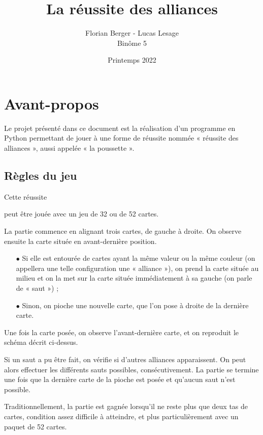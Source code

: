 \documentclass[titlepage]{article}
\title{\Huge{La réussite des alliances}}
\author{\Large{Florian Berger - Lucas Lesage}\\ \Large{Binôme 5}}
\date{Printemps 2022}
\begin{document}
\maketitle

\tableofcontents


\newpage
\section*{Avant-propos}

Le projet présenté dans ce document est la réalisation d’un programme en Python permettant de jouer à une forme de réussite nommée « réussite des alliances », aussi appelée « la poussette ». 

\subsection*{Règles du jeu}
\hypertarget{avant-propos}{Cette réussite} peut être jouée avec un jeu de 32 ou de 52 cartes. \par
La partie commence en alignant trois cartes, de gauche à droite. On observe ensuite la carte située en avant-dernière position. \vspace{5pt}
	\begin{itemize}
	\item[$\bullet$] Si elle est entourée de cartes ayant la même valeur ou la même couleur (on appellera une telle configuration une « alliance »), on prend la carte située au milieu et on la met sur la carte située immédiatement à sa gauche (on parle de « saut ») ;
	\item[$\bullet$] Sinon, on pioche une nouvelle carte, que l’on pose à droite de la dernière carte.
	\end{itemize}\par
\vspace{5pt}Une fois la carte posée, on observe l’avant-dernière carte, et on reproduit le schéma décrit ci-dessus.\par  
Si un saut a pu être fait, on vérifie si d’autres alliances apparaissent. On peut alors effectuer les différents sauts possibles, consécutivement.
La partie se termine une fois que la dernière carte de la pioche est posée et qu’aucun saut n’est possible.\par 
Traditionnellement, la partie est gagnée lorsqu’il ne reste plus que deux tas de cartes, condition assez difficile à atteindre, et plus particulièrement avec un paquet de 52 cartes.\par 
\end{document}
